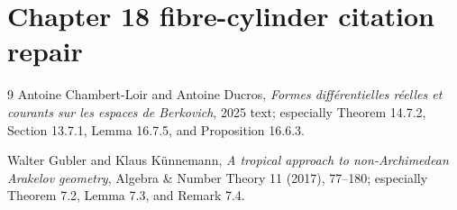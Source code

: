 \documentclass[11pt]{article}
\begin{document}
\section*{Chapter 18 fibre-cylinder citation repair}



\begin{thebibliography}{9}
Antoine Chambert-Loir and Antoine Ducros,
\emph{Formes diff\'erentielles r\'eelles et courants sur les espaces de
Berkovich}, 2025 text; especially Theorem 14.7.2, Section 13.7.1,
Lemma 16.7.5, and Proposition 16.6.3.

Walter Gubler and Klaus K\"unnemann,
\emph{A tropical approach to non-Archimedean Arakelov geometry},
Algebra \& Number Theory 11 (2017), 77--180; especially Theorem 7.2,
Lemma 7.3, and Remark 7.4.
\end{thebibliography}
\end{document}
